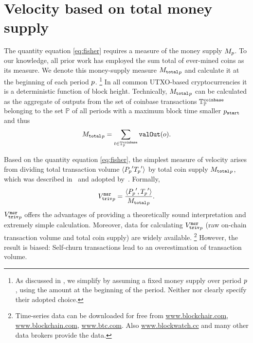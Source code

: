 \section{Velocity based on total money supply}
\label{sec:oldmeas}%
The quantity equation \eqref{eq:fisher} requires a measure of the money
supply ${M_{p}}$. %
To our knowledge, all prior work has employed the sum total of ever-mined
coins as its measure. %
We denote this money-supply measure ${{M_{\mathtt{total}}}_{p}}$ and calculate it at the
beginning of each period ${p}$. %
\footnote{%
  As discussed in , we simplify by assuming a fixed money
  supply over period ${p}$, using the amount at the beginning of the
  period. %
  Neither \cite{kalodner2017blocksci} nor \cite{athey2016bitcoin} clearly
  specify their adopted choice.} %
In all common UTXO-based cryptocurrencies it is a deterministic function of
block height. %
Technically, ${{M_{\mathtt{total}}}_{p}}$ can be calculated as the aggregate of outputs from the set of coinbase transactions \( {\mathbb{T}^{\mathtt{coinbase}}_{\mathbb{P}}} \) belonging to the set \( \mathbb{P} \) of all periods with a maximum block time smaller \({p}_{\mathtt{start}}\) and thus
\begin{align}%
  \MTotalP = \sum_{t \in \TxC} \valO(o).%
\end{align}%

Based on the quantity equation \eqref{eq:fisher}, the simplest measure of
velocity arises from dividing total transaction volume
$\langle {P_{p}}'{T_{p}}' \rangle$ by total coin supply ${{M_{\mathtt{total}}}_{p}}$, which was
described in~\cite{bolt2016value} and adopted by~\cite{ciaian2018price}. %
%
Formally,
\begin{align}%
  \VNaiveEstP = \frac{\langle\Pp',\Tp'\rangle}{\MTotalP}.%
\end{align}%
%
${{V_{\mathtt{triv}}^{\mathtt{msr}}}_{p}}$ offers the advantages of providing a theoretically sound
interpretation and extremely simple calculation. %
Moreover, data for calculating ${{V_{\mathtt{triv}}^{\mathtt{msr}}}_{p}}$ (raw on-chain transaction volume
and total coin supply) are widely available. %
\footnote{Time-series data can be downloaded for free from %
  \url{www.blockchair.com}, \url{www.blockchain.com}, \url{www.btc.com}. %
  Also \url{www.blockwatch.cc} and many other data brokers provide the data.}
However, the result is biased: Self-churn transactions lead to an
overestimation of transaction volume. %
 
